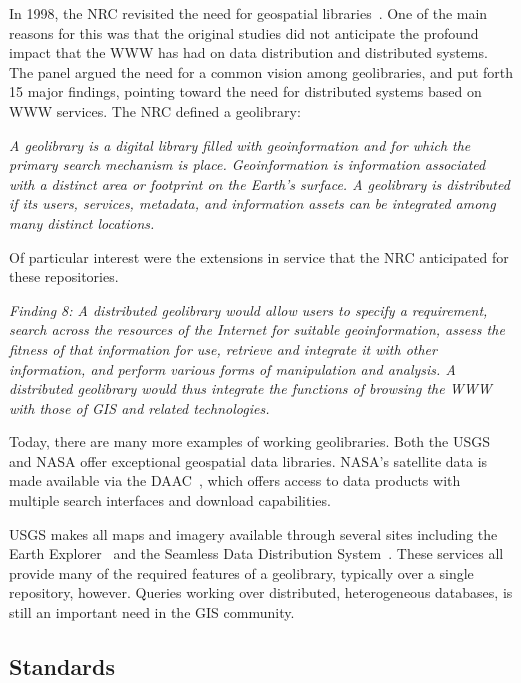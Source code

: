 \documentclass{ucdthesis}       %
\begin{document}
In 1998, the \ac{NRC} revisited the need for geospatial
libraries~\cite{nrc98distr-geolib}.  One of the main reasons for
this was that the original studies did not anticipate the profound
impact that the \ac{WWW} has had on data distribution and distributed
systems.  The panel argued the need for a common vision among
geolibraries, and put forth 15 major findings, pointing toward the
need for distributed systems based on \ac{WWW} services.  The \ac{NRC}
defined a geolibrary:

\emph{ A geolibrary is a digital library filled with geoinformation
  and for which the primary search mechanism is place. Geoinformation
  is information associated with a distinct area or footprint on the
  Earth's surface. A geolibrary is distributed if its users, services,
  metadata, and information assets can be integrated among many
  distinct locations.}

Of particular interest were the extensions in service that the
\ac{NRC} anticipated for these repositories.

\emph{ Finding 8: A distributed geolibrary would allow users to
  specify a requirement, search across the resources of the Internet
  for suitable geoinformation, assess the fitness of that information
  for use, retrieve and integrate it with other information, and
  perform various forms of manipulation and analysis. A distributed
  geolibrary would thus integrate the functions of browsing the WWW
  with those of GIS and related technologies.}

Today, there are many more examples of working geolibraries.  Both the
\ac{USGS} and \ac{NASA} offer exceptional geospatial data
libraries.  \ac{NASA}'s satellite data is made available via the
\acf{DAAC}~\cite{nasa06goddar-distr}, which offers access to data
products with multiple search interfaces and download capabilities.

\ac{USGS} makes all maps and imagery available through several sites
including the Earth Explorer~\cite{usgsearth-explor} and the Seamless
Data Distribution System~\cite{usgsseaml-data-distr-system}.  These
services all provide many of the required features of a geolibrary,
typically over a single repository, however.  Queries working over
distributed, heterogeneous databases, is still an important need in
the \ac{GIS} community.

\subsection{Standards}
\end{document}
